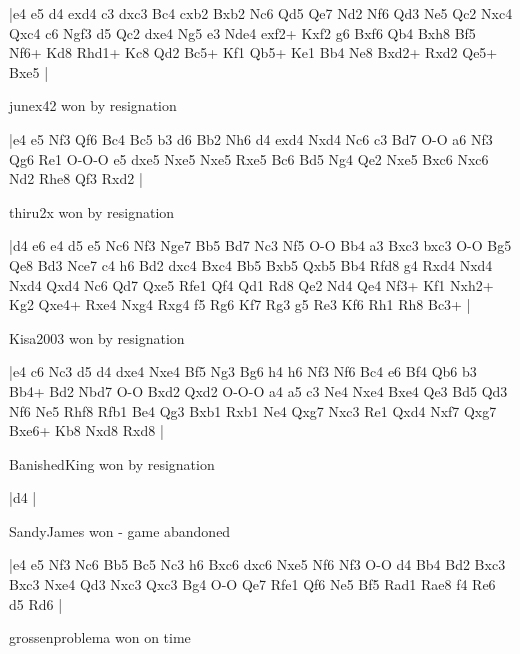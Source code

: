 \makegametitle
|e4 e5 d4 exd4 c3 dxc3 Bc4 cxb2 Bxb2 Nc6 Qd5 Qe7 Nd2 Nf6 Qd3 Ne5 Qc2 Nxc4 Qxc4 c6 Ngf3 d5 Qc2 dxe4 Ng5 e3 Nde4 exf2+ Kxf2 g6 Bxf6 Qb4 Bxh8 Bf5 Nf6+ Kd8 Rhd1+ Kc8 Qd2 Bc5+ Kf1 Qb5+ Ke1 Bb4 Ne8 Bxd2+ Rxd2 Qe5+ Bxe5  |

\showboard

junex42 won by resignation

\makegametitle
|e4 e5 Nf3 Qf6 Bc4 Bc5 b3 d6 Bb2 Nh6 d4 exd4 Nxd4 Nc6 c3 Bd7 O-O a6 Nf3 Qg6 Re1 O-O-O e5 dxe5 Nxe5 Nxe5 Rxe5 Bc6 Bd5 Ng4 Qe2 Nxe5 Bxc6 Nxc6 Nd2 Rhe8 Qf3 Rxd2  |

\showboard

thiru2x won by resignation

\makegametitle
|d4 e6 e4 d5 e5 Nc6 Nf3 Nge7 Bb5 Bd7 Nc3 Nf5 O-O Bb4 a3 Bxc3 bxc3 O-O Bg5 Qe8 Bd3 Nce7 c4 h6 Bd2 dxc4 Bxc4 Bb5 Bxb5 Qxb5 Bb4 Rfd8 g4 Rxd4 Nxd4 Nxd4 Qxd4 Nc6 Qd7 Qxe5 Rfe1 Qf4 Qd1 Rd8 Qe2 Nd4 Qe4 Nf3+ Kf1 Nxh2+ Kg2 Qxe4+ Rxe4 Nxg4 Rxg4 f5 Rg6 Kf7 Rg3 g5 Re3 Kf6 Rh1 Rh8 Bc3+  |

\showboard

Kisa2003 won by resignation

\makegametitle
|e4 c6 Nc3 d5 d4 dxe4 Nxe4 Bf5 Ng3 Bg6 h4 h6 Nf3 Nf6 Bc4 e6 Bf4 Qb6 b3 Bb4+ Bd2 Nbd7 O-O Bxd2 Qxd2 O-O-O a4 a5 c3 Ne4 Nxe4 Bxe4 Qe3 Bd5 Qd3 Nf6 Ne5 Rhf8 Rfb1 Be4 Qg3 Bxb1 Rxb1 Ne4 Qxg7 Nxc3 Re1 Qxd4 Nxf7 Qxg7 Bxe6+ Kb8 Nxd8 Rxd8  |

\showboard

BanishedKing won by resignation

\makegametitle
|d4  |

\showboard

SandyJames won - game abandoned

\makegametitle
|e4 e5 Nf3 Nc6 Bb5 Bc5 Nc3 h6 Bxc6 dxc6 Nxe5 Nf6 Nf3 O-O d4 Bb4 Bd2 Bxc3 Bxc3 Nxe4 Qd3 Nxc3 Qxc3 Bg4 O-O Qe7 Rfe1 Qf6 Ne5 Bf5 Rad1 Rae8 f4 Re6 d5 Rd6  |

\showboard

grossenproblema won on time

